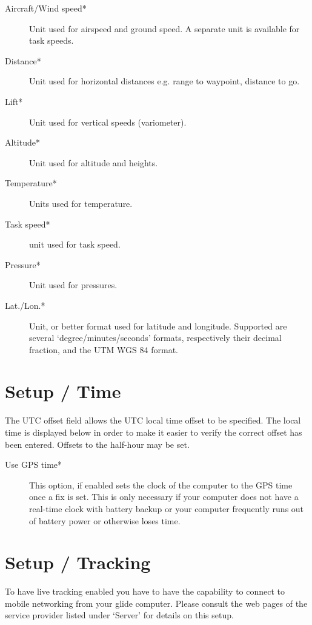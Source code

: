 \begin{description}
\item[Aircraft/Wind speed*]  Unit used for airspeed and ground speed. A separate
  unit is available for task speeds.
\item[Distance*]  Unit used for horizontal distances e.g. range to waypoint, distance to go.
\item[Lift*]  Unit used for vertical speeds (variometer).
\item[Altitude*] Unit used for altitude and heights.
\item[Temperature*]  Units used for temperature.
\item[Task speed*] unit used for task speed.
\item[Pressure*]  Unit used for pressures.
\item[Lat./Lon.*]  Unit, or better format used for latitude and longitude. Supported are several `degree/minutes/seconds' formats, respectively their decimal fraction, and the  UTM WGS 84 format.
\end{description}


\section{Setup / Time}

The UTC offset field allows the UTC local time offset to be specified.
The local time is displayed below in order to make it easier to verify
the correct offset has been entered.  Offsets to the half-hour may be
set.

\begin{description}
\item[Use GPS time*] This option, if enabled sets the clock of the computer to 
  the GPS time once a fix is set. This is only necessary if your computer does 
  not have a real-time clock with battery backup or your computer 
  frequently runs out of battery power or otherwise loses time.
\end{description}


\section{Setup / Tracking}

To have live tracking enabled you have to have the capability to connect to 
mobile networking from your glide computer.
Please consult the web pages of the service provider listed under `Server' 
for details on this setup.




